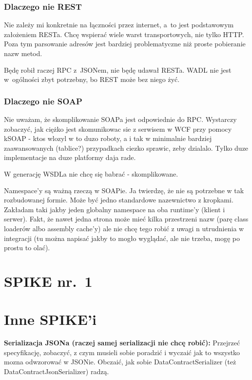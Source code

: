 \subsubsection{Dlaczego nie REST}
Nie zależy mi konkretnie na łączności przez internet, a~to jest podstawowym założeniem RESTa.
Chcę wspierać wiele warst transportowych, nie tylko HTTP. Poza tym parsowanie adresów jest bardziej problematyczne niż proste pobieranie nazw metod.

Będę robił raczej RPC z~JSONem, nie będę udawał RESTa.
WADL nie jest w~ogólności zbyt potrzebny, bo REST może bez niego żyć.

\subsubsection{Dlaczego nie SOAP}
Nie uważam, że skomplikowanie SOAPa jest odpowiednie do RPC\@. Wystarczy zobaczyć, jak ciężko jest skomunikowac sie z serwisem w WCF przy pomocy kSOAP - ktos wlozyl w to duzo roboty, a i tak w minimalnie bardziej zaawansowanych (tablice?) przypadkach ciezko sprawic, zeby dzialalo. Tylko duze implementacje na duze platformy daja rade.

W generację WSDLa nie chcę się babrać - skomplikowane.

Namespace'y są ważną rzeczą w SOAPie. Ja twierdzę, że nie są potrzebne w tak rozbudowanej formie. Może być jedno standardowe nazewnictwo z kropkami. Zakładam taki jakby jeden globalny namespace na oba runtime'y (klient i serwer). Fakt, że nawet jedna strona może mieć kilka przestrzeni nazw (parę class loaderów albo assembly cache'y) ale nie chcę tego robić z uwagi n utrudnienia w integracji (tu można napisać jakby to mogło wyglądać, ale nie trzeba, mogę po prostu to olać).

\section{SPIKE nr.\ 1}



\section{Inne SPIKE'i}

\textbf{Serializacja JSONa (raczej samej serializacji nie chcę robić):}
Przejrzeć specyfikację, zobaczyć, z czym musieli sobie poradzić i wyczaić jak to wszystko mozna odwzorować w JSONie. Obczaić, jak sobie DataContractSerializer (też DataContractJsonSerializer) radzą.

